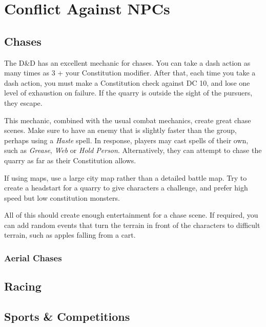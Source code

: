 \documentclass[twocolumn]{dndbook}
\begin{document}
\chapter{Conflict Against NPCs}
\section{Chases}

The D\&D has an excellent mechanic for chases.
You can take a dash action as many times as 3 + your Constitution modifier.
After that, each time you take a dash action, you must make a Constitution check against DC 10, and lose one level of exhaustion on failure.
If the quarry is outside the sight of the pursuers, they escape.\par

This mechanic, combined with the usual combat mechanics, create great chase scenes.
Make sure to have an enemy that is slightly faster than the group, perhaps using a \emph{Haste} spell.
In response, players may cast spells of their own, such as \emph{Grease}, \emph{Web} or \emph{Hold Person}.
Alternatively, they can attempt to chase the quarry as far as their Constitution allows.\par

If using maps, use a large city map rather than a detailed battle map.
Try to create a headstart for a quarry to give characters a challenge, and prefer high speed but low constitution monsters.\par

All of this should create enough entertainment for a chase scene.
If required, you can add random events that turn the terrain in front of the characters to difficult terrain, such as apples falling from a cart.\par




\subsection{Aerial Chases}
\section{Racing}
\section{Sports \& Competitions}
\end{document}
